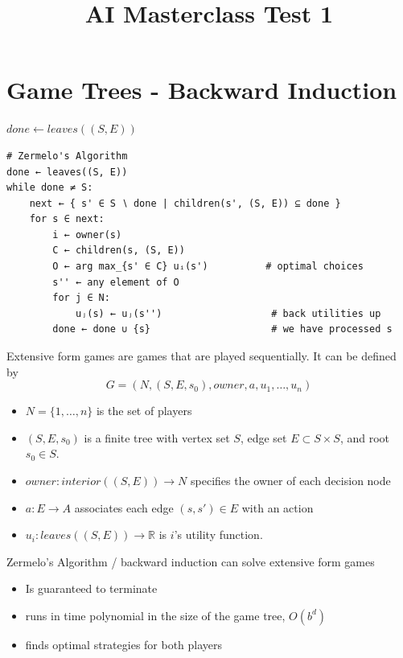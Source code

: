 \documentclass[12pt, a4paper]{article}
\title{AI Masterclass Test 1}
\author{}
\date{}
\begin{document}
\section{Game Trees - Backward Induction}

\begin{algorithm}[H]
\caption{Zermelo's Algorithm}
\DontPrintSemicolon

$done \leftarrow leaves((S, E))$\;
\end{algorithm}
\begin{Verbatim}
# Zermelo's Algorithm
done ← leaves((S, E))
while done ≠ S:
    next ← { s' ∈ S ∖ done | children(s', (S, E)) ⊆ done }
    for s ∈ next:
        i ← owner(s)
        C ← children(s, (S, E))
        O ← arg max_{s' ∈ C} uᵢ(s')          # optimal choices
        s'' ← any element of O
        for j ∈ N:
            uⱼ(s) ← uⱼ(s'')                   # back utilities up
        done ← done ∪ {s}                     # we have processed s
\end{Verbatim}

\medskip
\noindent Extensive form games are games that are played sequentially. It can be defined by
\[G = (N, (S, E, s_0), owner, a, u_1,\ldots,u_n)\]
\begin{itemize}
        \item $N = \{1,\ldots,n\}$ is the set of players
        \item $(S, E, s_0)$ is a finite tree with vertex set $S$,
        edge set $E \subset S \times S$, and root $s_0 \in S$.
        \item $owner: interior((S, E))\rightarrow N$ specifies the owner of each decision node
        \item $a: E \rightarrow A$ associates each edge $(s, s') \in E$ with an action
        \item $u_i : leaves((S, E))\rightarrow\mathbb{R}$ is $i$'s utility function.
\end{itemize}

\noindent Zermelo's Algorithm / backward induction can solve extensive form games
\begin{itemize}
    \item Is guaranteed to terminate
    \item runs in time polynomial in the size of the game tree, $O(b^d)$
    \item finds optimal strategies for both players
\end{itemize}
\end{document}
